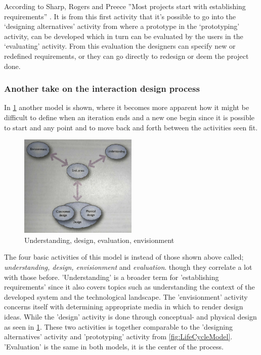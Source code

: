 According to Sharp, Rogers and Preece ''Most projects start with establishing requirements'' \citep[p.~333]{InteractionDesign}. It is from this first activity that it’s possible to go into the ‘designing alternatives’ activity from where a prototype in the ‘prototyping’ activity, can be developed which in turn can be evaluated by the users in the ‘evaluating’ activity. From this evaluation the designers can specify new or redefined requirements, or they can go directly to redesign or deem the project done. 

\subsubsection{Another take on the interaction design process}\label{sec:Iterative2}
In \cref{fig:DEBModel} another model is shown, where it becomes more apparent how it might be difficult to define when an iteration ends and a new one begin since it is possible to start and any point and to move back and forth between the activities seen fit.

\begin{figure}[H]
	\centering
	\includegraphics[width=0.5\textwidth]{billeder/DEBModel.png}
	\caption{Understanding, design, evaluation, envisionment \citep[p.~49]{Benyon}}\label{fig:DEBModel}
\end{figure}

The four basic activities of this model is instead of those shown above called; \textit{understanding, design, envisionment} and \textit{evaluation}.
though they correlate a lot with those before. 
'Understanding' is a broader term for 'establishing requirements' since it also covers topics such as understanding the context of the developed system and the technological landscape.
The 'envisionment' activity concerns itself with determining appropriate media in which to render design ideas.
While the 'design' activity is done through conceptual- and physical design as seen in \cref{fig:DEBModel}.
These two activities is together comparable to the 'designing alternatives' activity and 'prototyping' activity from \cref{fig:LifeCycleModel}.
'Evaluation' is the same in both models, it is the center of the process.


